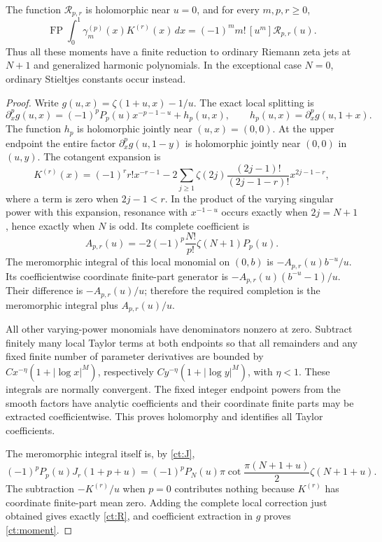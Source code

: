 \begin{theorem}
\label{ct:closure}
The function $\mathcal R_{p,r}$ is holomorphic near $u=0$, and for every
$m,p,r\ge0$,
\begin{equation}\label{ct:moment}
 \boxed{\displaystyle
 \operatorname{FP}\int_0^1\gamma_m^{(p)}(x)K^{(r)}(x)\,dx
       =(-1)^m m!\,[u^m]\mathcal R_{p,r}(u).}
\end{equation}
Thus all these moments have a finite reduction to ordinary Riemann zeta
jets at $N+1$ and generalized harmonic polynomials. In the exceptional
case $N=0$, ordinary Stieltjes constants occur instead.
\end{theorem}
\begin{proof}
Write $g(u,x)=\zeta(1+u,x)-1/u$. The exact local splitting is
\[
 \partial_x^pg(u,x)
   =(-1)^pP_p(u)x^{-p-1-u}+h_p(u,x),\qquad
 h_p(u,x)=\partial_x^pg(u,1+x).
\]
The function $h_p$ is holomorphic jointly near $(u,x)=(0,0)$.
At the upper endpoint the entire factor $\partial_x^pg(u,1-y)$ is
holomorphic jointly near $(0,0)$ in $(u,y)$. The cotangent expansion is
\[
 K^{(r)}(x)=(-1)^rr!x^{-r-1}
 -2\sum_{j\ge1}\zeta(2j)
        \frac{(2j-1)!}{(2j-1-r)!}x^{2j-1-r},
\]
where a term is zero when $2j-1<r$.
In the product of the varying singular power with this expansion,
resonance with $x^{-1-u}$ occurs exactly when
$2j=N+1$, hence exactly when $N$ is odd. Its complete coefficient is
\[
 A_{p,r}(u)
 =-2(-1)^p\frac{N!}{p!}\zeta(N+1)P_p(u).
\]
The meromorphic integral of this local monomial on $(0,b)$ is
$-A_{p,r}(u)b^{-u}/u$. Its coefficientwise coordinate finite-part
generator is $-A_{p,r}(u)(b^{-u}-1)/u$. Their difference is
$-A_{p,r}(u)/u$; therefore the required completion is the meromorphic
integral plus $A_{p,r}(u)/u$.

All other varying-power monomials have denominators nonzero at zero.
Subtract finitely many local Taylor terms at both endpoints so that all
remainders and any fixed finite number of parameter derivatives are
bounded by $Cx^{-\eta}(1+|\log x|^M)$, respectively
$Cy^{-\eta}(1+|\log y|^M)$, with $\eta<1$. These integrals are normally
convergent. The fixed integer endpoint powers from the smooth factors
have analytic coefficients and their coordinate finite parts may be
extracted coefficientwise. This proves holomorphy and identifies all
Taylor coefficients.

The meromorphic integral itself is, by \eqref{ct:J},
\[
 (-1)^pP_p(u)J_r(1+p+u)
 =(-1)^pP_N(u)\pi\cot\frac{\pi(N+1+u)}2\zeta(N+1+u).
\]
The subtraction $-K^{(r)}/u$ when $p=0$ contributes nothing because
$K^{(r)}$ has coordinate finite-part mean zero. Adding the complete
local correction just obtained gives exactly \eqref{ct:R}, and
coefficient extraction in $g$ proves \eqref{ct:moment}.
\end{proof}

